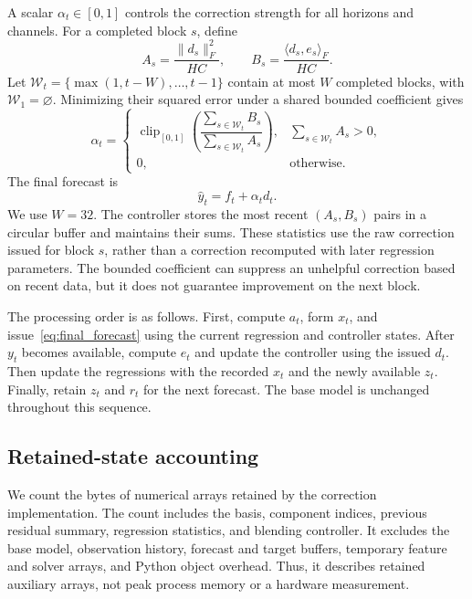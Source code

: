 A scalar $\alpha_t\in[0,1]$ controls the correction strength for all horizons and channels. For a completed block $s$, define
\begin{equation}
 A_s=\frac{\lVert d_s\rVert_F^2}{HC},\qquad
 B_s=\frac{\langle d_s,e_s\rangle_F}{HC}.
 \label{eq:blend_statistics}
\end{equation}
Let $\mathcal W_t=\{\max(1,t-W),\ldots,t-1\}$ contain at most $W$ completed blocks, with $\mathcal W_1=\varnothing$. Minimizing their squared error under a shared bounded coefficient gives
\begin{equation}
 \alpha_t=\begin{cases}
 \operatorname{clip}_{[0,1]}\!\left(
 \dfrac{\sum_{s\in\mathcal W_t}B_s}{\sum_{s\in\mathcal W_t}A_s}
 \right), & \sum_{s\in\mathcal W_t}A_s>0,\\
 0, & \text{otherwise}.
 \end{cases}
 \label{eq:blend_weight}
\end{equation}
The final forecast is
\begin{equation}
 \widehat y_t=f_t+\alpha_t d_t.
 \label{eq:final_forecast}
\end{equation}
We use $W=32$. The controller stores the most recent $(A_s,B_s)$ pairs in a circular buffer and maintains their sums. These statistics use the raw correction issued for block $s$, rather than a correction recomputed with later regression parameters. The bounded coefficient can suppress an unhelpful correction based on recent data, but it does not guarantee improvement on the next block.

The processing order is as follows. First, compute $a_t$, form $x_t$, and issue~\eqref{eq:final_forecast} using the current regression and controller states. After $y_t$ becomes available, compute $e_t$ and update the controller using the issued $d_t$. Then update the regressions with the recorded $x_t$ and the newly available $z_t$. Finally, retain $z_t$ and $r_t$ for the next forecast. The base model is unchanged throughout this sequence.

\subsection{Retained-state accounting}
We count the bytes of numerical arrays retained by the correction implementation. The count includes the basis, component indices, previous residual summary, regression statistics, and blending controller. It excludes the base model, observation history, forecast and target buffers, temporary feature and solver arrays, and Python object overhead. Thus, it describes retained auxiliary arrays, not peak process memory or a hardware measurement.

